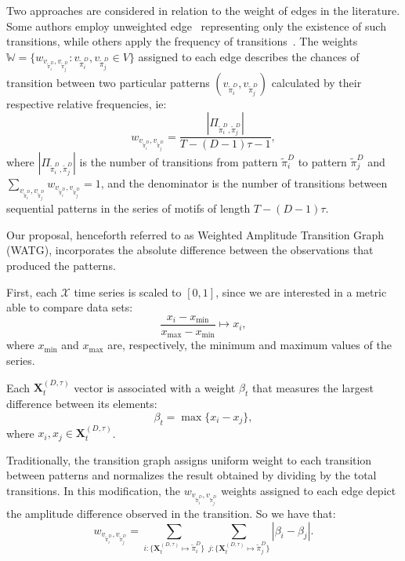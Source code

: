 \documentclass{isprs}
\begin{document}
Two approaches are considered in relation to the weight of edges in the literature.
Some authors employ unweighted edge~\cite{McCullough2015lagged,Kulp2016ordinal} representing only the existence of such transitions, while others apply the frequency of transitions~\cite{Sorrentino2015periodic,Zhang2017ConstructingOP}.
The weights $\mathbb{W} = \{w_{v_{\widetilde{\pi}^D_i}, v_{\widetilde\pi^D_j}}: v_{\widetilde\pi^D_i}, v_{\widetilde\pi^D_j} \in V \}$ assigned to each edge describes the chances of transition between two particular patterns $(v_{\widetilde\pi^D_i}, v_{\widetilde\pi^D_j})$ calculated by their respective relative frequencies, ie:	
\begin{equation}
w_{v_{\widetilde\pi^D_i}, v_{\widetilde\pi^D_j}} = \frac{|\Pi_{\widetilde\pi^D_i,\widetilde\pi^D_j}|}{T-(D-1)\tau-1},
\end{equation}
where $|\Pi_{\widetilde\pi^D_i,\widetilde\pi^D_j}|$ is the number of transitions from pattern $\widetilde\pi^D_i$ to pattern $\widetilde\pi^D_j$ and $\sum_{v_{\widetilde\pi^D_i}, v_{\widetilde\pi^D_j}}w_{v_{\widetilde\pi^D_i}, v_{\widetilde\pi^D_j}} = 1$,
and the denominator is the number of transitions between sequential patterns in the series of motifs of length $T-(D-1)\tau$.

Our proposal, henceforth referred to as Weighted Amplitude Transition Graph (WATG), incorporates the absolute difference between the observations that produced the patterns.

First, each $\mathcal{X}$ time series is scaled to $[0, 1]$, since we are interested in a metric able to compare data sets:
\begin{equation}
 \frac{x_i - x_{\min}}{x_{\max} - x_{\min}} \longmapsto x_i,
\end{equation}
where $x_{\min}$ and $x_{\max}$ are, respectively, the minimum and maximum values of the series.

Each $\mathbf{X}^{(D, \tau)}_t$ vector is associated with a weight $\beta_t$ that measures the largest difference between its elements:
\begin{equation}
\beta_t = \max\{x_i - x_j\},
\end{equation}
where $x_i, x_j \in \mathbf{X}^{(D, \tau)}_t$.

Traditionally, the transition graph assigns uniform weight to each transition between patterns and normalizes the result obtained by dividing by the total transitions.
In this modification, the $w_{v_{\widetilde\pi^D_i}, v_{\widetilde\pi^D_j}}$ weights assigned to each edge depict the amplitude difference observed in the transition.
So we have that:	
\begin{equation}
w_{v_{\widetilde \pi^D_i}, v_{\widetilde \pi^D_j}} =  \sum_{i : \{\mathbf{X}^{(D,\tau)}_t \mapsto \widetilde\pi^D_i\}} \sum_{j : \{\mathbf{X}^{(D,\tau)}_t \mapsto \widetilde\pi^D_j\}} |\beta_i - \beta_j| .
\end{equation}
\end{document}
